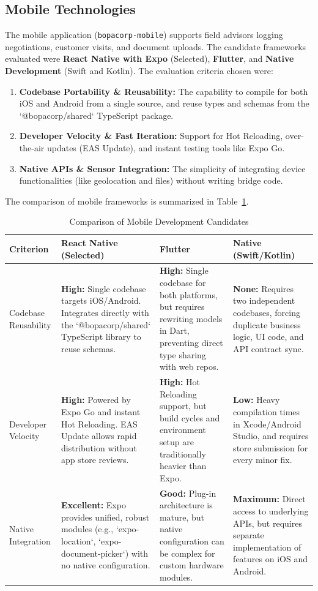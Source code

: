 \documentclass[letterpaper%
, oneside%
, 12pt%
, memoireprojet%
, english%
,creativecommons,hyperref, withAlgo2e %
]{thETS}
\begin{document}
\subsection{Mobile Technologies}
The mobile application (\texttt{bopacorp-mobile}) supports field advisors logging negotiations, customer visits, and document uploads. The candidate frameworks evaluated were \textbf{React Native with Expo} (Selected), \textbf{Flutter}, and \textbf{Native Development} (Swift and Kotlin). The evaluation criteria chosen were:
\begin{enumerate}
    \item \textbf{Codebase Portability \& Reusability:} The capability to compile for both iOS and Android from a single source, and reuse types and schemas from the `@bopacorp/shared` TypeScript package.
    \item \textbf{Developer Velocity \& Fast Iteration:} Support for Hot Reloading, over-the-air updates (EAS Update), and instant testing tools like Expo Go.
    \item \textbf{Native APIs \& Sensor Integration:} The simplicity of integrating device functionalities (like geolocation and files) without writing bridge code.
\end{enumerate}

The comparison of mobile frameworks is summarized in Table~\ref{tab:mobile_comparison}.

\begin{table}[H]
\centering
\begin{tabular}{|p{2.5cm}|p{4.2cm}|p{4.2cm}|p{4.2cm}|}
\hline
\textbf{Criterion} & \textbf{React Native (Selected)} & \textbf{Flutter} & \textbf{Native (Swift/Kotlin)} \\ \hline
Codebase Reusability & \textbf{High:} Single codebase targets iOS/Android. Integrates directly with the `@bopacorp/shared` TypeScript library to reuse schemas. & \textbf{High:} Single codebase for both platforms, but requires rewriting models in Dart, preventing direct type sharing with web repos. & \textbf{None:} Requires two independent codebases, forcing duplicate business logic, UI code, and API contract sync. \\ \hline
Developer Velocity & \textbf{High:} Powered by Expo Go and instant Hot Reloading. EAS Update allows rapid distribution without app store reviews. & \textbf{High:} Hot Reloading support, but build cycles and environment setup are traditionally heavier than Expo. & \textbf{Low:} Heavy compilation times in Xcode/Android Studio, and requires store submission for every minor fix. \\ \hline
Native Integration & \textbf{Excellent:} Expo provides unified, robust modules (e.g., `expo-location`, `expo-document-picker`) with no native configuration. & \textbf{Good:} Plug-in architecture is mature, but native configuration can be complex for custom hardware modules. & \textbf{Maximum:} Direct access to underlying APIs, but requires separate implementation of features on iOS and Android. \\ \hline
\end{tabular}
\caption{Comparison of Mobile Development Candidates}
\label{tab:mobile_comparison}
\end{table}
\end{document}
